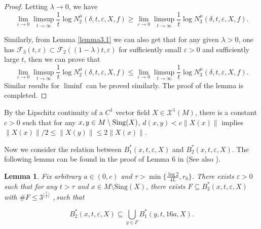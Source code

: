 \documentclass[10pt]{article}
\newtheorem*{Theorem A}{Theorem A}
\newtheorem{Lemma}[Theorem]{Lemma}
\begin{document}
\begin{proof}
\noindent
 Letting $\lambda \to 0$, we have
\[
\lim_{\varepsilon \to 0} \limsup_{t \to \infty} \frac{1}{t} \log N_2^\mu(\delta, t, \varepsilon, X, f) \geq \lim_{\varepsilon \to 0} \limsup_{t \to \infty} \frac{1}{t} \log N_3^\mu(\delta, t, \varepsilon, X, f).
\]

Similarly, from Lemma \ref{lemma3.1} we can also get that for any given $\lambda > 0$, one has $\mathcal{F}_3(t, \varepsilon)\subset \mathcal{F}_2((1 - \lambda)t, \varepsilon)$ for sufficiently small $\varepsilon>0$ and sufficiently large $t$, then we can prove that
\[
\lim_{\varepsilon \to 0} \limsup_{t \to \infty} \frac{1}{t} \log N_2^\mu(\delta, t, \varepsilon, X, f) \leq \lim_{\varepsilon \to 0} \limsup_{t \to \infty} \frac{1}{t} \log N_3^\mu(\delta, t, \varepsilon, X, f).
\]
Similar results for $\liminf$ can be proved similarly. The proof of the lemma is completed.
\end{proof}


By the Lipschitz continuity of a $C^1$ vector field $X\in\mathcal{X}^1(M)$, there is a constant $c>0$ such that for any $x,y\in M\setminus{\rm Sing}(X)$, $d(x,y)<c\|X(x)\|$ implies $\|X(x)\|/2\leq \|X(y)\|\leq 2\|X(x)\|$.


Now we consider the relation between $B^*_1(x, t, \varepsilon, X)$ and $B^*_2(x, t, \varepsilon, X)$. The following lemma can be found in the proof of Lemma 6 in \cite{WANG2024128673} (See also \cite{yang2025rescaledexpansivemeasuresflows}).

\begin{Lemma}\label{lemma3.3}
Fix arbitrary \( a\in(0, c) \)  and \( \tau > \min\{\frac{\log 2}{4L}, r_0\} \). There exists \( \varepsilon > 0 \) such that for any \( t > \tau \) and \( x \in M \setminus \text{Sing}(X) \), there exists  \( F \subseteq B_2^*(x, t, \varepsilon, X) \) with \( \#F \leq 3^{\lfloor\frac{t}{\tau}\rfloor} \) ,\,such that

\[
B_2^*(x, t, \varepsilon, X) \subseteq \bigcup_{y \in F} B_1^*(y, t, 16a, X).
\]
  \end{Lemma}
\end{document}
